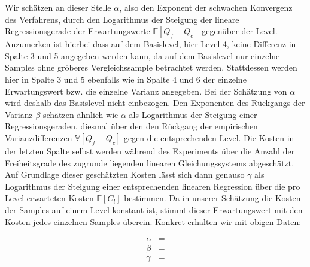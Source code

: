 Wir schätzen an dieser Stelle $ \alpha $, also den Exponent der schwachen Konvergenz des Verfahrens, durch den Logarithmus der Steigung der lineare Regressionsgerade der Erwartungswerte $ \mathbb{E}[Q_f - Q_c] $ gegenüber der Level. Anzumerken ist hierbei dass auf dem Basislevel, hier Level 4, keine Differenz in Spalte 3 und 5 angegeben werden kann, da auf dem Basislevel nur einzelne Samples ohne gröberes Vergleichssample betrachtet werden. Stattdessen werden hier in Spalte 3 und 5 ebenfalls wie in Spalte 4 und 6 der einzelne Erwartungswert bzw. die einzelne Varianz angegeben. Bei der Schätzung von $ \alpha $ wird deshalb das Basislevel nicht einbezogen.
Den Exponenten des Rückgangs der Varianz $ \beta $ schätzen ähnlich wie $ \alpha $ als Logarithmus der Steigung einer Regressionsgeraden, diesmal über den den Rückgang der empirischen Varianzdifferenzen  $ \mathbb{V}[Q_f-Q_c] $ gegen die entsprechenden Level. Die Kosten in der letzten Spalte selbst werden während des Experiments über die Anzahl der Freiheitsgrade des zugrunde liegenden linearen Gleichungssystems abgeschätzt. 
Auf Grundlage dieser geschätzten Kosten lässt sich dann genauso $ \gamma $ als Logarithmus der Steigung einer entsprechenden linearen Regression über die pro Level erwarteten Kosten $ \mathbb{E}[C_l] $ bestimmen. Da in unserer Schätzung die Kosten der Samples auf einem Level konstant ist, stimmt dieser Erwartungswert mit den Kosten jedes einzelnen Samples überein.  
Konkret erhalten wir mit obigen Daten: 

\begin{align*}
\alpha &= \\
\beta &= \\
\gamma &= \\
\end{align*}
